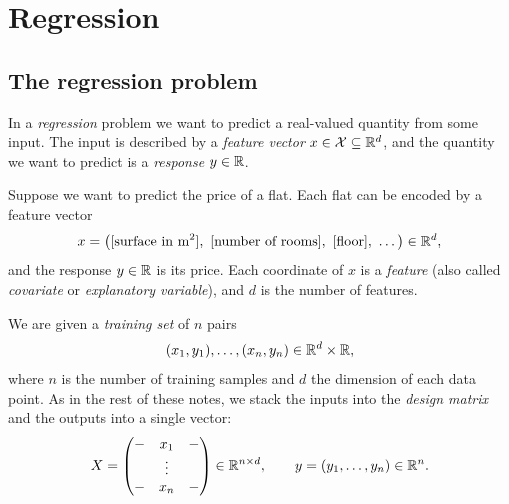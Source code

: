 \section{Regression}
\label{sec:regression}

\subsection{The regression problem}

In a \emph{regression} problem we want to predict a real-valued quantity from
some input. The input is described by a \emph{feature vector}
$x \in \mathcal{X} \subseteq \mathbb{R}^d$, and the quantity we want to predict is a
\emph{response} $y \in \mathbb{R}$.

\begin{example}
Suppose we want to predict the price of a flat. Each flat can be encoded by a
feature vector
\[
x = \big( [\text{surface in m}^2],\ [\text{number of rooms}],\ [\text{floor}],\ \dots \big) \in \R^d ,
\]
and the response $y \in \mathbb{R}$ is its price. Each coordinate of $x$ is a
\emph{feature} (also called \emph{covariate} or \emph{explanatory variable}),
and $d$ is the number of features.
\end{example}

We are given a \emph{training set} of $n$ pairs
\[
(x_1, y_1), \dots, (x_n, y_n) \in \mathbb{R}^d \times \mathbb{R} ,
\]
where $n$ is the number of training samples and $d$ the dimension of each data
point. As in the rest of these notes, we stack the inputs into the
\emph{design matrix} and the outputs into a single vector:
\[
X = \begin{pmatrix}
- & x_1 & - \\
  & \vdots &  \\
- & x_n & -
\end{pmatrix} \in \mathbb{R}^{n \times d},
\qquad
y = (y_1, \dots, y_n) \in \mathbb{R}^n .
\]

